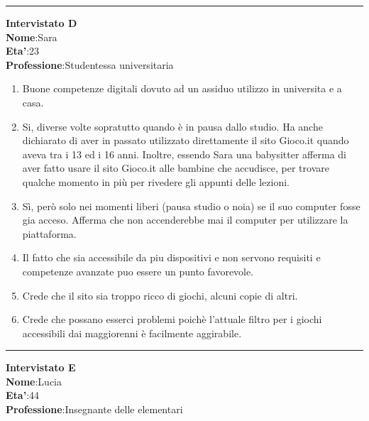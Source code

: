 \documentclass[../Report.tex]{subfiles}
\begin{document}
    \hrule
    \textbf{Intervistato D}\\

    \textbf{Nome}:Sara\\
    \textbf{Eta'}:23\\
    \textbf{Professione}:Studentessa universitaria

    \begin{enumerate}
        \item Buone competenze digitali dovuto ad un assiduo utilizzo in universita e a casa.
        \item Si, diverse volte sopratutto quando è in pausa dallo studio. Ha anche dichiarato di aver in passato utilizzato direttamente il sito Gioco.it quando aveva tra i 13 ed i 16 anni. Inoltre, essendo Sara una babysitter afferma di aver fatto usare il sito Gioco.it alle bambine che accudisce, per trovare qualche momento in più per rivedere gli appunti delle lezioni. 
        \item Sì, però solo nei momenti liberi (pausa studio o noia) se il suo computer fosse gia acceso. Afferma che  non accenderebbe mai il computer per utilizzare la piattaforma.
        \item Il fatto che sia accessibile da piu dispositivi e non servono requisiti e competenze avanzate puo essere un punto favorevole.
        \item Crede che il sito sia troppo ricco di giochi, alcuni copie di altri. 
        \item Crede che possano esserci problemi poichè l'attuale filtro per i giochi accessibili dai maggiorenni è facilmente aggirabile.
        
    \end{enumerate}

    \hrule
    \textbf{Intervistato E}\\

    \textbf{Nome}:Lucia\\
    \textbf{Eta'}:44\\
    \textbf{Professione}:Insegnante delle elementari
\end{document}
